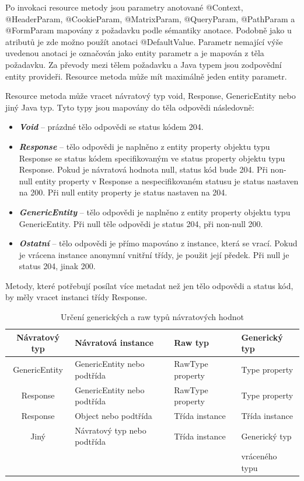\documentclass[11pt,twoside,a4paper]{book}
\begin{document}
Po invokaci resource metody jsou parametry anotované @Context, @HeaderParam,
@CookieParam, @MatrixParam, @QueryParam, @PathParam a @FormParam mapovány z
požadavku podle sémantiky anotace. Podobně jako u atributů je zde možno použít anotaci
@DefaultValue. Parametr nemající výše uvedenou anotaci je označován jako entity parametr
a je mapován z těla požadavku. Za převody mezi tělem požadavku a Java typem jsou
zodpovědní entity provideři. Resource metoda může mít maximálně jeden entity parametr.

Resource metoda může vracet návratový typ void, Response, GenericEntity nebo jiný Java
typ. Tyto typy jsou mapovány do těla odpovědi následovně:

\begin{itemize}
  \item \textbf{\textit{Void}} – prázdné tělo odpovědi se status kódem 204.
  \item \textbf{\textit{Response}} – tělo odpovědi je naplněno z entity
  property objektu typu Response se status kódem specifikovaným ve status property objektu typu Response. Pokud je
návratová hodnota null, status kód bude 204. Při non-null entity property v Response a
nespecifikovaném statusu je status nastaven na 200. Při null entity property je status
nastaven na 204.
  \item \textbf{\textit{GenericEntity}} – tělo odpovědi je naplněno
  z entity property objektu typu GenericEntity. Při null těle odpovědi je status 204, při non-null 200.
  \item \textbf{\textit{Ostatní}} – tělo odpovědi je přímo mapováno z
  instance, která se vrací.
Pokud je vrácena instance anonymní vnitřní třídy, je použit její předek. Při null je status 204,
jinak 200.
\end{itemize}

Metody, které potřebují posílat více metadat než jen tělo odpovědi a status kód, by měly
vracet instanci třídy Response.

\begin{table}
\begin{center}
\begin{tabular}{|c|l|l|l|}
\hline
\textbf{Návratový typ} & \textbf{Návratová instance} & \textbf{Raw typ} &
\textbf{Generický typ} \\
\hline
GenericEntity & GenericEntity nebo podtřída & RawType property & Type property \\
\hline
Response & GenericEntity nebo podtřída & RawType property & Type property \\
\hline
Response & Object nebo podtřída  & Třída instance & Třída instance \\
\hline
Jiný & Návratový typ nebo podtřída  & Třída instance & Generický typ \\
&&&  vráceného typu \\
\hline
\end{tabular}
\end{center}
\caption{Určení generických a raw typů návratových hodnot}
\label{tab:tab1}
\end{table}
\end{document}
